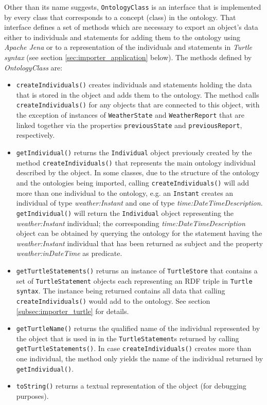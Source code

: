 Other than its name suggests, \texttt{OntologyClass} is an interface that is implemented by every class that corresponds to a concept (class) in the ontology. That interface defines a set of methods which are necessary to export an object's data either to individuals and statements for adding them to the ontology using \emph{Apache Jena} or to a representation of the individuals and statements in \emph{Turtle syntax} (see section \ref{sec:importer_application} below). The methods defined by \emph{OntologyClass} are:
\begin{itemize}
  \item \texttt{createIndividuals()} creates individuals and statements holding the data that is stored in the object and adds them to the ontology. The method calls \texttt{createIndividuals()} for any objects that are connected to this object, with the exception of instances of \texttt{WeatherState} and \texttt{WeatherReport} that are linked together via the properties \texttt{previousState} and \texttt{previousReport}, respectively.
  \item \texttt{getIndividual()} returns the \texttt{Individual} object previously created by the method \texttt{createIndividuals()} that represents the main ontology individual described by the object. In some classes, due to the structure of the \thinkhomeweather ontology and the ontologies being imported, calling \texttt{createIndividuals()} will add more than one individual to the ontology, e.g. an \texttt{Instant} creates an individual of type \emph{weather:Instant} and one of type \emph{time:DateTimeDescription}. \texttt{getIndividual()} will return the \texttt{Individual} object representing the \emph{weather:Instant} individual; the corresponding \emph{time:DateTimeDescription} object can be obtained by querying the ontology for the statement having the \emph{weather:Instant} individual that has been returned as subject and the property \emph{weather:inDateTime} as predicate.
  \item \texttt{getTurtleStatements()} returns an instance of \texttt{TurtleStore} that contains a set of \texttt{TurtleStatement} objects each representing an RDF triple in \texttt{Turtle syntax}. The instance being returned contains all data that calling \texttt{createIndividuals()} would add to the ontology. See section \ref{subsec:importer_turtle} for details.
  \item \texttt{getTurtleName()} returns the qualified name of the individual represented by the object that is used in in the \texttt{TurtleStatement}s returned by calling \texttt{getTurtleStatements()}. In case \texttt{createIndividuals()} creates more than one individual, the method only yields the name of the individual returned by \texttt{getIndividual()}.
  \item \texttt{toString()} returns a textual representation of the object (for debugging purposes).
\end{itemize}

